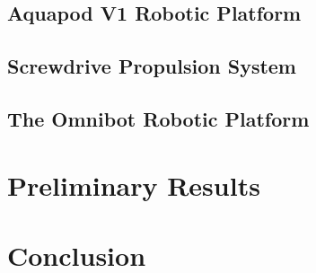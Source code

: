	
	\subsection{Aquapod V1 Robotic Platform}
	

	\clearpage
	\subsection{Screwdrive Propulsion System}
	
	
	\clearpage
	\subsection{The Omnibot Robotic Platform}
	\label{sec:omnibot}
	






\clearpage
\section{Preliminary Results}

	




\section{Conclusion}
\label{sec:conclusion}

